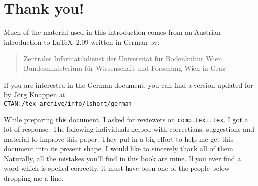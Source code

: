 \chapter{Thank you!}
\noindent Much of the material used in this introduction comes from an
Austrian introduction to \LaTeX\ 2.09 written in German by:
\begin{verse}
%
{Zentraler Informatikdienst der Universit\"at f\"ur Bodenkultur Wien}
%
   {Bundesministerium f\"ur Wissenschaft und Forschung Wien}
%
   {in Graz}
\end{verse}

If you are interested in the German document, you can find a version
updated for \LaTeXe{} by J\"org Knappen at\\
\texttt{CTAN:/tex-archive/info/lshort/german}

\newpage
\noindent While preparing this document, I asked
for reviewers on \texttt{comp.text.tex}. I got a lot of response. The
following individuals helped with corrections, suggestions and
material to improve this paper. They put in a big effort to help me
get this document into its present shape. I would like to
sincerely thank all of them. Naturally, all the mistakes you'll find
in this book are mine. If you ever find a word which is spelled
correctly, it must have been one of the people below dropping me a
line.

